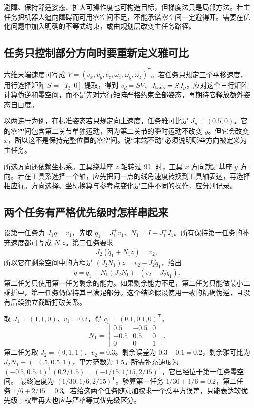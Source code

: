 避障、保持舒适姿态、扩大可操作度也可构造目标，但梯度法只是局部方法。若主任务把机器人逼向障碍而可用零空间不足，不能承诺零空间一定避得开。需要在优化问题中加入明确的不等式约束，或由规划层改变主任务路径。


\subsection{任务只控制部分方向时要重新定义雅可比}
六维末端速度可写成 $V=(v_x,v_y,v_z,\omega_x,\omega_y,\omega_z)^\mathsf T$。若任务只规定三个平移速度，用行选择矩阵 $S=[I_3\ \ 0]$ 提取，得到 $v_d=SV$、$J_{\rm task}=SJ_g$。应对这个三行矩阵计算伪逆和零空间，而不是先对六行矩阵严格约束全部姿态，再期待它释放额外姿态自由度。

以两连杆为例，在标准姿态若只规定向上速度，任务雅可比是 $J_y=(0.5,0)$。它的零空间包含第二关节单独运动，因为第二关节的瞬时运动不改变 $y$。但它会改变 $x$，所以这不是保持完整位置的零空间。说“末端不动”必须说明哪些方向被定义为主任务。

所选方向还依赖坐标系。工具绕基座 $z$ 轴转过 $90^\circ$ 时，工具 $x$ 方向就是基座 $y$ 方向。若在工具系选择一个轴，应先把同一点的线角速度转换到工具轴表达，再选择相应行。方向选择、坐标换算与参考点变化是三件不同的操作，应分别记录。

\subsection{两个任务有严格优先级时怎样串起来}
设第一任务为 $J_1\dot q=v_1$，先取 $\dot q_1=J_1^+v_1$、$N_1=I-J_1^+J_1$。所有保持第一任务的补充速度都可写成 $N_1z$。第二任务要求
\[
 J_2(\dot q_1+N_1z)=v_2,
\]
所以它在剩余空间中的方程是 $(J_2N_1)z=v_2-J_2\dot q_1$，给出
\begin{equation}
 \dot q=\dot q_1+N_1(J_2N_1)^+(v_2-J_2\dot q_1).
\end{equation}
第二任务只使用第一任务剩余的能力。如果剩余能力不足，第二任务只能做最小二乘折中，第一任务仍保持其已满足部分。这个结论假设使用一致的精确伪逆，且没有后续独立截断打破关系。

\begin{examplebox}[算例 两级任务都能满足时逐项求速度]
取 $J_1=(1,1,0)$、$v_1=0.2$，得 $\dot q_1=(0.1,0.1,0)^\mathsf T$，
\[
 N_1=\begin{bmatrix}0.5&-0.5&0\\-0.5&0.5&0\\0&0&1\end{bmatrix}.
\]
第二任务取 $J_2=(0,1,1)$、$v_2=0.3$。剩余误差为 $0.3-0.1=0.2$，剩余雅可比为 $J_2N_1=(-0.5,0.5,1)$，平方范数为 1.5。所需补充速度为 $(-0.5,0.5,1)^\mathsf T(0.2/1.5)=(-1/15,1/15,2/15)^\mathsf T$，它已经位于第一任务零空间。
最终速度为 $(1/30,1/6,2/15)^\mathsf T$。验算第一任务 $1/30+1/6=0.2$，第二任务 $1/6+2/15=0.3$。若给这两个任务随意加权求一个总平方误差，只能表达软优先级；权重再大也应与严格等式优先级区分。
\end{examplebox}

